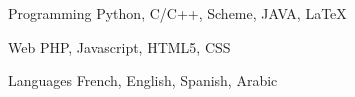 


\begin{cvskills}


\cvskill
{Programming} %
{Python, C/C++, Scheme, JAVA, LaTeX} %


\cvskill
{Web} %
{PHP, Javascript, HTML5, CSS} %


\cvskill
{Languages} %
{French, English, Spanish, Arabic} %


\end{cvskills}